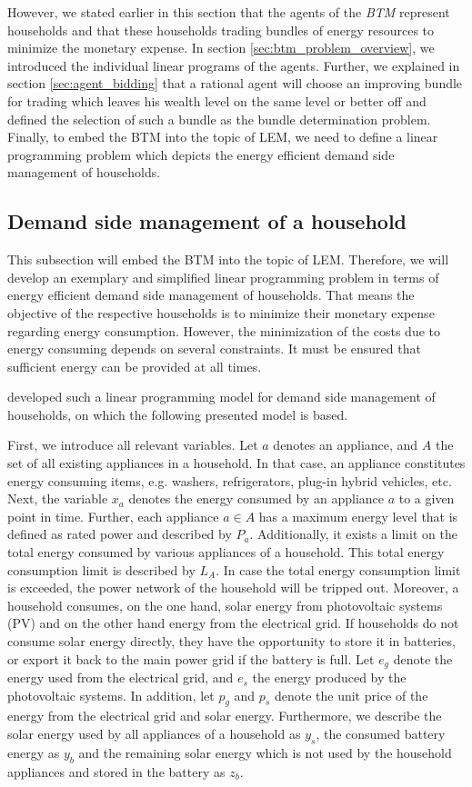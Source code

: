 However, we stated earlier in this section that the agents of the \textit{BTM} represent households
and that these households trading bundles of energy resources to minimize the monetary expense. 
In section \ref{sec:btm_problem_overview}, we introduced the individual linear programs of the agents.
Further, we explained in section \ref{sec:agent_bidding} that a rational agent will choose an improving bundle for 
trading which leaves his wealth level on the same level or better off and defined the selection of such a bundle 
as the bundle determination problem.
Finally, to embed the BTM into the topic of LEM, we need to define 
a linear programming problem which depicts the energy efficient demand side management of households.

\subsection{Demand side management of a household}
This subsection will embed the BTM into the topic of LEM. 
Therefore, we will develop an exemplary and simplified linear programming problem in terms of energy efficient demand side management of households. 
That means the objective of the respective households is to minimize their monetary expense regarding energy consumption.
However, the minimization of the costs due to energy consuming depends on several constraints. 
It must be ensured that sufficient energy can be provided at all times.

 developed such a linear programming model for demand side management of households, on which the following
presented model is based. 

First, we introduce all relevant variables. Let $a$ denotes an appliance, and $A$ the set of all existing appliances in a household.
In that case, an appliance constitutes energy consuming items, e.g. washers, refrigerators, plug-in hybrid vehicles, etc.
Next, the variable $x_{a}$ denotes the energy consumed by an appliance $a$ to a given point in time. 
Further, each appliance $a \in A$ has a maximum energy level that is defined as rated power and described by $P_{a}$.
Additionally, it exists a limit on the total energy consumed by various appliances of a household. This total energy consumption limit is described by $L_{A}$. In case the total energy consumption limit is exceeded, the power network of the household will be tripped out.
Moreover, a household consumes, on the one hand, solar energy from
photovoltaic systems (PV) and on the other hand energy from the electrical grid. 
If households do not consume solar energy directly, they have the opportunity to 
store it in batteries, or export it back to the main power grid if the battery is full.
Let $e_{g}$ denote the energy used from the electrical grid, and $e_{s}$ the energy produced by the photovoltaic systems.
In addition, let $p_{g}$ and $p_{s}$ denote the unit price of the energy from the electrical grid and solar energy.
Furthermore, we describe the solar energy used by all appliances of a household as $y_{s}$, the consumed battery energy 
as $y_{b}$ and the remaining solar energy which is not used by the household appliances and stored in the battery as $z_{b}$.

